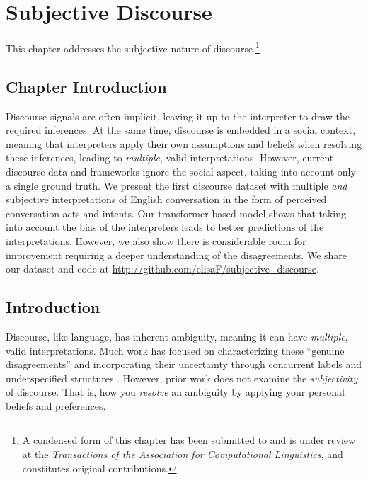 \chapter{Subjective Discourse}
\label{ch:subjective}

This chapter addresses the subjective nature of discourse.\footnote{A condensed form of this chapter has been submitted to and is under review at the \emph{Transactions of the Association for Computational Linguistics}, and constitutes original contributions.}

\section{Chapter Introduction}
Discourse signals are often implicit, leaving it up to the interpreter to draw the required inferences. At the same time, discourse is embedded in a social context, meaning that interpreters apply their own assumptions and beliefs when resolving these inferences, leading to \emph{multiple}, valid interpretations. However, current discourse data and frameworks ignore the social aspect, taking into account only a single ground truth. We present the first discourse dataset with multiple \emph{and} subjective interpretations of English conversation in the form of perceived conversation acts and intents. Our transformer-based model shows that taking into account the bias of the interpreters leads to better predictions of the interpretations. However, we also show there is considerable room for improvement requiring a deeper understanding of the disagreements. We share our dataset and code at \url{http://github.com/elisaF/subjective_discourse}.

\section{Introduction}
\label{intro}

Discourse, like language, has inherent ambiguity, meaning it can have \emph{multiple}, valid interpretations. Much work has focused on characterizing these ``genuine disagreements'' \cite{Poesio:2019,Das:2017,Asher:2003,Webber:2019b} and incorporating their uncertainty through concurrent labels \cite{Rohde:2018} and underspecified structures \cite{Hanneforth:2003}. However, prior work does not examine the \emph{subjectivity} of discourse. That is, how you \emph{resolve} an ambiguity by applying your personal beliefs and preferences. 

